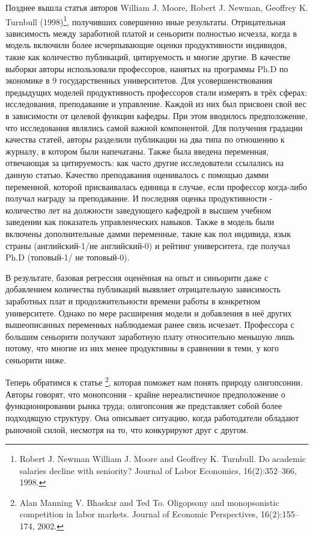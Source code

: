 \documentclass[a4paper, 12pt]{article}
\theoremstyle{definition}
\theoremstyle{plain}
\begin{document}
	Позднее вышла статья авторов William J. Moore, Robert J. Newman, Geoffrey K. Turnbull (1998)\footnote{Robert J. Newman William J. Moore and Geoffrey K. Turnbull. Do academic salaries decline with seniority? Journal of Labor Economics, 16(2):352–366, 1998.}, получивших совершенно иные результаты. Отрицательная зависимость  между заработной платой и сеньорити полностью исчезла, когда в модель включили более исчерпывающие оценки продуктивности индивидов, такие как количество публикаций, цитируемость и многие другие. В качестве выборки авторы использовали профессоров, нанятых на программы Ph.D по экономике в 9 государственных университетов. Для усовершенствования предыдущих моделей продуктивность профессоров стали измерять в трёх сферах: исследования, преподавание и управление. Каждой из них был присвоен свой вес в зависимости от целевой функции кафедры. При этом вводилось предположение, что  исследования являлись самой важной компонентой. Для получения градации качества статей, авторы разделили публикации на два типа по отношению к журналу, в котором были напечатаны. Также была введена переменная, отвечающая за цитируемость: как часто другие исследователи ссылались на данную статью. Качество преподавания оценивалось с помощью дамми переменной, которой присваивалась единица в случае, если профессор когда-либо получал награду за преподавание. И последняя оценка продуктивности - количество лет на должности заведующего кафедрой в высшем учебном заведении как показатель управленческих навыков. Также в модель были включены дополнительные дамми переменные, такие как пол индивида, язык страны (английский-1/не английский-0) и рейтинг университета, где получал Ph.D (топовый-1/ не топовый-0). 
	
	В результате, базовая регрессия оценённая на опыт и синьорити даже с добавлением количества публикаций выявляет отрицательную зависимость заработных плат и продолжительности времени работы в конкретном университете. Однако по мере расширения модели и добавления в неё других вышеописанных переменных наблюдаемая ранее связь исчезает. Профессора с большим сеньорити получают заработную плату относительно меньшую лишь потому, что многие из них менее продуктивны в сравнении в теми, у кого сеньорити ниже.
	
	Теперь обратимся к статье \cite{2}\footnote{Alan Manning V. Bhaskar and Ted To. Oligopsony and monopsonistic competition in labor markets. Journal of Economic Perspectives, 16(2):155–174, 2002.}, которая поможет нам понять природу олигопсонии. Авторы говорят,  что монопсония - крайне нереалистичное предположение о функционировании рынка труда; олигопсония же представляет собой более подходящую структуру. Она описывает ситуацию, когда работодатели обладают рыночной силой, несмотря на то, что конкурируют друг с другом. 
\end{document}

